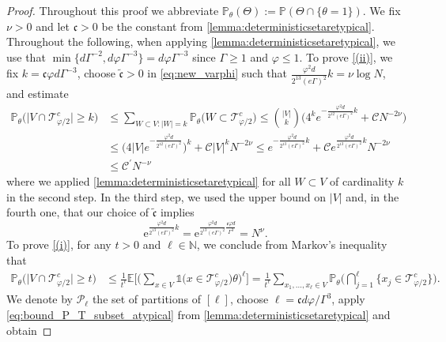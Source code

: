 \documentclass[11pt]{article}
\newcommand{\ee}{\mathrm{e}}
\newcommand{\abs}[1]{\left| #1 \right|}
\newcommand{\absn}[1]{\bigl| #1 \bigr|} %
\newcommand{\N}{\mathbb{N}}
\newcommand{\ccc}{\mathfrak{c}}
\theoremstyle{plain}
\theoremstyle{remark}
\numberwithin{equation}{section}
\begin{document}
\begin{proof}
		Throughout this proof we abbreviate $\mathbb{P}_{\theta}(\Theta) := \mathbb{P}(\Theta \cap \{ \theta =1 \})$. We fix $\nu >0$ and let $\ccc>0$ be the constant from \cref{lemma:deterministicsetaretypical}. Throughout the following, when applying \cref{lemma:deterministicsetaretypical}, we use that $\min\{ d \Gamma^{-2},  d \varphi \Gamma^{-3}\}= d \varphi \Gamma^{-3}$ since $\Gamma \geq 1$ and $\varphi \leq 1$.
		To prove \cref{(ii)}, 
		 we fix  $k = \ccc \varphi d\Gamma^{-3}$, choose $\tilde{\ccc}>0$ 
		 in \cref{eq:new_varphi} such that $\frac{\varphi^2d}{2^{13} (e\Gamma)^2}k = \nu \log N $, and estimate
		\begin{align*}
			\mathbb{P}_{\theta}\big( \absn{V \cap \mathcal{T}_{\varphi/2}^c} \ge k \big) &\le \sum_{W \subset V:\abs{W}=k}\mathbb{P}_{\theta}\big( W \subset \mathcal{T}_{\varphi/2}^c \big) \le \binom{\abs{V}}{k} \Big( 4^{k} e^{-\frac{\varphi^2d}{2^{12} (e\Gamma)^2}k} + \mathcal{C}N^{-2 \nu}\Big)\\
			&\le \Big(4\abs{V}e^{-\frac{\varphi^2d}{2^{12}(e\Gamma)^2}}\Big)^k + \mathcal{C} \abs{V}^{k}N^{-2\nu}\le  e^{-\frac{\varphi^2d}{2^{13} (e\Gamma)^2}k}+ \mathcal{C}e^{\frac{\varphi^2d}{2^{13} (e\Gamma)^2}k} N^{-2\nu} \\
			&\le \mathcal{C^{\prime}} N^{-\nu}
		\end{align*}
where we applied \cref{lemma:deterministicsetaretypical} for all $ W \subset V$ of cardinality $k$ in the second step. In the third step, we used the upper bound on $\abs{V}$ and, in the fourth one, 
that our choice of $\tilde{\ccc}$ implies 
\begin{equation} \label{eq:choice_varphi_conclusion} 
\ee^{\frac{\varphi^2d}{2^{13} (e\Gamma)^2}k}= \ee^{\frac{\varphi^2d}{2^{13} (e\Gamma)^2} \frac{\ccc \varphi d}{\Gamma^3}} = N^{\nu}. 
\end{equation} 
To prove \cref{(i)}, for any $t>0$ and $\ell \in \N$, we conclude from Markov's inequality that 
\begin{align*}
			\mathbb{P}_{\theta} \big( \absn{V \cap \mathcal{T}_{\varphi/2}^c} \ge t \big) &\le \frac{1}{t^{\ell}} \mathbb{E} \biggl[ \biggl( \sum_{x \in V} \mathds{1}\big( x \in \mathcal{T}_{\varphi/2}^c \big) \theta \biggl)^{\ell}\biggr] = \frac{1}{t^\ell}\sum_{x_1,...,x_{\ell} \in V}\mathbb{P}_{\theta}\biggl( \bigcap_{j=1}^{\ell} \big\{x_j \in \mathcal{T}_{\varphi/2}^c \big\} \biggr).
		\end{align*}
	We denote by $\mathcal{P}_{\ell}$ the set of partitions of $[\ell]$, choose  $\ell =\ccc d\varphi/\Gamma^3$, apply \cref{eq:bound_P_T_subset_atypical} from \cref{lemma:deterministicsetaretypical} and obtain

\end{proof}
\end{document}
